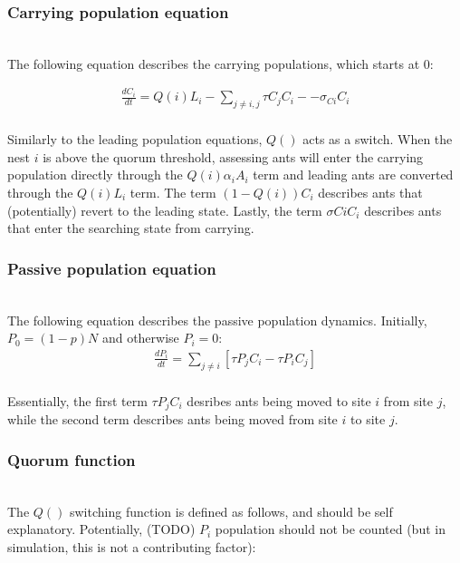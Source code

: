 \documentclass{article}
\begin{document}
\subsubsection{Carrying population equation}
\hfill\\

The following equation describes the carrying populations, which starts at $0$:

\begin{multline}
        \frac{dC_i}{dt} = Q(i)L_i - \sum_{j \neq i, j} \tau C_jC_i - - \sigma_{Ci}C_i \\
\end{multline}

Similarly to the leading population equations, $Q()$ acts as a switch. When the nest $i$ is above the quorum threshold, assessing ants will enter the carrying population directly through the $Q(i)\alpha_iA_i$ term and leading ants are converted through the $Q(i)L_i$ term.
The term $(1-Q(i))C_i$ describes ants that (potentially) revert to the leading state. 
Lastly, the term $\sigma{Ci}C_i$ describes ants that enter the searching state from carrying.

\subsubsection{Passive population equation}
\hfill\\

The following equation describes the passive population dynamics. Initially, $P_0 = (1-p)N$ and otherwise $P_i = 0$:
\begin{equation}
\begin{aligned}
        \frac{dP_i}{dt} = \sum_{j \neq i} [\tau P_j C_i - \tau P_i C_j] \\
\end{aligned}
\end{equation}

Essentially, the first term $\tau P_jC_i$ desribes ants being moved to site $i$ from site $j$, while the second term describes ants being moved from site $i$ to site $j$.

\subsubsection{Quorum function}
\hfill\\

The $Q()$ switching function is defined as follows, and should be self explanatory. Potentially, (TODO) $P_i$ population should not be counted (but in simulation, this is not a contributing factor):
\end{document}
